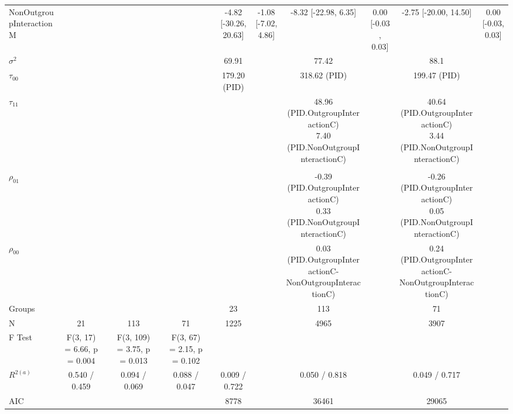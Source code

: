 \begin{landscape}
\begin{table}
\begin{minipage}[t][\textheight][t]{\textwidth}
{\begin{tabular}[t]{lcccccccccccc}
\hspace{1em}NonOutgroupInteractionM &  &  &  &  &  &  & -4.82 [-30.26, 20.63] & -1.08 [-7.02, 4.86] & -8.32 [-22.98,  6.35] & 0.00 [-0.03, 0.03] & -2.75 [-20.00, 14.50] & 0.00 [-0.03, 0.03]\\
\hspace{1em}$\sigma^2$ &  &  &  &  &  &  & 69.91 &  & 77.42 &  & 88.1 & \\
\hspace{1em}$\tau_{00}$ &  &  &  &  &  &  & 179.20 (PID) &  & 318.62 (PID) &  & 199.47 (PID) & \\
\hspace{1em}$\tau_{11}$ &  &  &  &  &  &  &  &  & \makecell[c]{48.96 (PID.OutgroupInteractionC)\\ 7.40 (PID.NonOutgroupInteractionC)} &  & \makecell[c]{40.64 (PID.OutgroupInteractionC)\\ 3.44 (PID.NonOutgroupInteractionC)} & \\
\addlinespace[0.3em]
\multicolumn{13}{l}{\textbf{Fit}}\\
\hspace{1em}$\rho_{01}$ &  &  &  &  &  &  &  &  & \makecell[c]{-0.39 (PID.OutgroupInteractionC)\\ 0.33 (PID.NonOutgroupInteractionC)} &  & \makecell[c]{-0.26 (PID.OutgroupInteractionC)\\ 0.05 (PID.NonOutgroupInteractionC)} & \\
\hspace{1em}$\rho_{00}$ &  &  &  &  &  &  &  &  & 0.03 (PID.OutgroupInteractionC-NonOutgroupInteractionC) &  & 0.24 (PID.OutgroupInteractionC-NonOutgroupInteractionC) & \\
\hspace{1em}Groups &  &  &  &  &  &  & 23 &  & 113 &  & 71 & \\
\hspace{1em}N & 21 &  & 113 &  & 71 &  & 1225 &  & 4965 &  & 3907 & \\
\hspace{1em}F Test & F(3, 17) = 6.66, p =  0.004 &  & F(3, 109) = 3.75, p =  0.013 &  & F(3, 67) = 2.15, p =  0.102 &  &  &  &  &  &  & \\
\hspace{1em}$R^{2 (a)}$ & 0.540 / 0.459 &  & 0.094 / 0.069 &  & 0.088 / 0.047 &  & 0.009 / 0.722 &  & 0.050 / 0.818 &  & 0.049 / 0.717 & \\
\hspace{1em}AIC &  &  &  &  &  &  & 8778 &  & 36461 &  & 29065 & \\

\end{tabular}}
\end{minipage}
\end{table}
\end{landscape}
